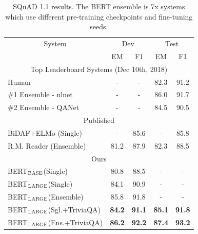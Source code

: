 \documentclass[11pt,a4paper]{article}
\newcommand\bertbase{BERT$_{\small \textsc{BASE}}$\xspace}
\newcommand\bertlarge{BERT$_{\small \textsc{LARGE}}$\xspace}
\begin{document}
\begin{table}[t]
\begin{center}
{\small
\begin{tabular}{@{}lcccc@{}}
  \toprule
  \multicolumn{1}{c}{System} & \multicolumn{2}{c}{Dev} & \multicolumn{2}{c}{Test} \\
  & EM & F1 & EM & F1 \\
  \midrule

  \multicolumn{5}{c}{Top Leaderboard Systems (Dec 10th, 2018)} \\
  Human                & - & - & 82.3 & 91.2 \\ 
  \#1 Ensemble - nlnet & - & - & 86.0 & 91.7 \\ 
  \#2 Ensemble - QANet & - & - & 84.5 & 90.5 \\ 
  \midrule
  \multicolumn{5}{c}{Published}     \\
 BiDAF+ELMo (Single)    & -    & 85.6  & -     & 85.8    \\ 
 R.M. Reader (Ensemble) & 81.2 & 87.9  & 82.3  & 88.5 \\ 
  \midrule
  \multicolumn{5}{c}{Ours} \\
  \bertbase (Single)     & 80.8 & 88.5 & -   & - \\ 
  \bertlarge (Single)    & 84.1 & 90.9 & -   & - \\ 
  \bertlarge (Ensemble)  & 85.8 & 91.8 & -   & - \\ 
  \bertlarge (Sgl.+TriviaQA) & {\bf 84.2} & {\bf 91.1} & {\bf 85.1} & {\bf 91.8} \\ 
  \bertlarge (Ens.+TriviaQA) & {\bf 86.2} & {\bf 92.2} & {\bf 87.4} & {\bf 93.2}
 \\ 

\bottomrule
\end{tabular}
} 
\end{center}
\caption{\label{tab:squad_results} SQuAD 1.1 results. The BERT ensemble is 7x systems which use different pre-training checkpoints and fine-tuning seeds.}
\end{table}
\end{document}
